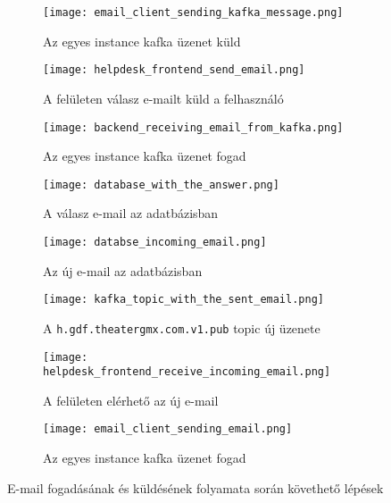 \begin{figure}
	\begin{subfigure}{.49\textwidth}
		\centering
		\texttt{[image: email\_client\_sending\_kafka\_message.png]}  
		\caption{Az egyes instance kafka üzenet küld}
		\label{fig:email_client_send_kafka}
	\end{subfigure}
	\begin{subfigure}{.49\textwidth}
		\centering
		\texttt{[image: helpdesk\_frontend\_send\_email.png]}  
		\caption{A felületen válasz e-mailt küld a felhasználó}
		\label{fig:frontend_send_answer}
	\end{subfigure}
	
	\quad
	
	\begin{subfigure}{.49\textwidth}
		\centering
		\texttt{[image: backend\_receiving\_email\_from\_kafka.png]}  
		\caption{Az egyes instance kafka üzenet fogad}
		\label{fig:backend_receive_kafka}
	\end{subfigure}
	\begin{subfigure}{.49\textwidth}
		\centering
		\texttt{[image: database\_with\_the\_answer.png]}  
		\caption{A válasz e-mail az adatbázisban}
		\label{fig:database_answer}
	\end{subfigure}

	\quad

\begin{subfigure}{.49\textwidth}
	\centering
	\texttt{[image: databse\_incoming\_email.png]}  
	\caption{Az új e-mail az adatbázisban}
	\label{fig:datbase_received_email}
\end{subfigure}
\begin{subfigure}{.49\textwidth}
	\centering
	\texttt{[image: kafka\_topic\_with\_the\_sent\_email.png]}  
	\caption{A \texttt{h.gdf.theater\textunderscore gmx.com.v1.pub} topic új üzenete}
	\label{fig:kafka_topic_send_email}
\end{subfigure}

	\quad

\begin{subfigure}{.45\textwidth}
	\centering
	\texttt{[image: helpdesk\_frontend\_receive\_incoming\_email.png]}  
	\caption{A felületen elérhető az új e-mail}
	\label{fig:frontend_read_email}
\end{subfigure}
\begin{subfigure}{.45\textwidth}
	\centering
	\texttt{[image: email\_client\_sending\_email.png]}  
	\caption{Az egyes instance kafka üzenet fogad}
	\label{fig:email_client_receives_kafka}
\end{subfigure}

	\caption[E-mail fogadásának és küldésének folyamata]{E-mail fogadásának és küldésének folyamata során követhető lépések}
	\label{fig:email_send_receive_visible}
\end{figure}



